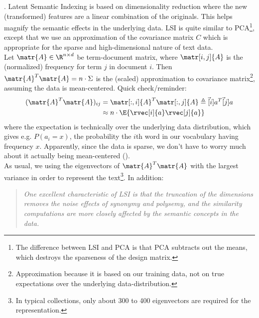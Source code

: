 \documentclass[11pt]{article}
\begin{document}
\myspace 
\p {}. Latent Semantic Indexing is based on dimensionality reduction where the new (transformed) features are a linear combination of the originals. This helps magnify the semantic effects in the underlying data. LSI is quite similar to PCA\footnote{The difference between LSI and PCA is that PCA subtracts out the means, which destroys the sparseness of the design matrix.}, except that we use an approximation of the covariance matrix $C$ which is appropriate for the sparse and high-dimensional nature of text data.\\

\p Let $\matr{A} \in \R^{n \times d}$ be term-document matrix, where $\matr[i, j]{A}$ is the (normalized) frequency for term $j$ in document $i$. Then $\matr{A}^T \matr{A} = n \cdot \Sigma$ is the (scaled) approximation to covariance matrix\footnote{Approximation because it is based on our training data, not on true expectations over the underlying data-distribution.}, assuming the data is mean-centered. Quick check/reminder:
\begin{align}
	(\matr{A}^T \matr{A})_{ij} &= \matr[:, i]{A}^T \matr[:, j]{A} \triangleq \vec[i]{a}^T \vec[j]{a} \\
	&\approx n \cdot \E{\rvec[i]{a} \rvec[j]{a}}
\end{align}
where the expectation is technically over the underlying data distribution, which gives e.g. $P(a_i = x)$, the probability the $i$th word in our vocabulary having frequency $x$. Apparently, since the data is sparse, we don't have to worry much about it actually being mean-centered (). \\

\p As usual, we using the eigenvectors of $\matr{A}^T \matr{A}$ with the largest variance in order to represent the text\footnote{In typical collections, only about 300 to 400 eigenvectors are required for the representation.}. In addition:
\begin{quote}
	\textit{{\small One excellent characteristic of LSI is that the truncation of the dimensions
			removes the noise effects of synonymy and polysemy, and the similarity computations are more closely affected by the semantic concepts in the data. }}
\end{quote}
\end{document}
